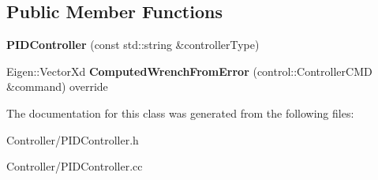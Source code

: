 \subsection*{Public Member Functions}
\begin{DoxyCompactItemize}
\item 
\mbox{\label{classproc__control_1_1_p_i_d_controller_a4f76acfe174b826405f4509179b0dbe5}} 
{\bfseries P\+I\+D\+Controller} (const std\+::string \&controller\+Type)
\item 
\mbox{\label{classproc__control_1_1_p_i_d_controller_af7cee6701ec98ebbead8429ce466cfaa}} 
Eigen\+::\+Vector\+Xd {\bfseries Computed\+Wrench\+From\+Error} (control\+::\+Controller\+C\+MD \&command) override
\end{DoxyCompactItemize}


The documentation for this class was generated from the following files\+:\begin{DoxyCompactItemize}
\item 
Controller/P\+I\+D\+Controller.\+h\item 
Controller/P\+I\+D\+Controller.\+cc\end{DoxyCompactItemize}
